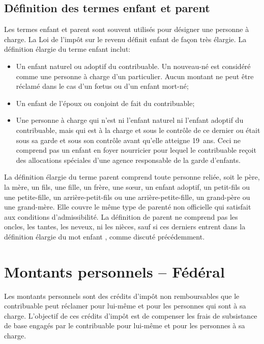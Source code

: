 \subsection{Définition des termes \og enfant \fg{} et \og parent \fg{}}
Les termes \og enfant \fg{} et \og parent \fg{} sont souvent utilisés pour désigner une personne à charge. La Loi de l'impôt sur le revenu définit \og enfant \fg{} de façon très élargie. La définition élargie du terme \og enfant \fg{} inclut:
\begin{itemize}
	\item Un enfant naturel ou adoptif du contribuable. Un nouveau-né est considéré comme une personne à charge d'un particulier. Aucun montant ne peut être réclamé dans le cas d'un fœtus ou d'un enfant mort-né;
	\item Un enfant de l'époux ou conjoint de fait du contribuable;
	\item Une personne à charge qui n'est ni l'enfant naturel ni l'enfant adoptif du contribuable, mais qui est à la charge et sous le contrôle de ce dernier ou était sous sa garde et sous son contrôle avant qu'elle atteigne 19~ans. Ceci ne comprend pas un enfant en foyer nourricier pour lequel le contribuable reçoit des allocations spéciales d'une agence responsable de la garde d'enfants.
\end{itemize}

La définition élargie du terme \og parent \fg{} comprend toute personne reliée, soit le père, la mère, un fils, une fille, un frère, une sœur, un enfant adoptif, un petit-fils ou une petite-fille, un arrière-petit-fils ou une arrière-petite-fille, un grand-père ou une grand-mère. Elle couvre le même type de parenté \og non officielle \fg{} qui satisfait aux conditions d'admissibilité. La définition de parent ne comprend pas les oncles, les tantes, les neveux, ni les nièces, sauf si ces derniers entrent dans la définition élargie du mot \og enfant \fg{}, comme discuté précédemment.



\section{Montants personnels – Fédéral}
\begin{intro}
	Les montants personnels sont des crédits d'impôt non remboursables que le contribuable peut réclamer pour lui-même et pour les personnes qui sont à sa charge. L'objectif de ces crédits d'impôt est de compenser les frais de subsistance de base engagés par le contribuable pour lui-même et pour les personnes à sa charge.
\end{intro}

